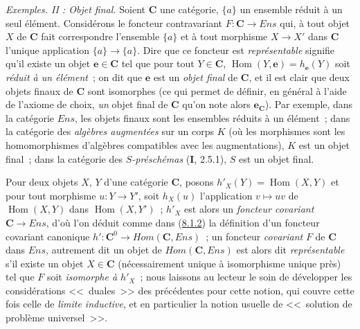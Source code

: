 \begin{env}[8.1.10]
\label{0.8.1.10-fr}
\textit{Exemples. II : Objet final.} Soient $\boldsymbol{C}$ une catégorie, $\{a\}$ un
ensemble réduit à un seul élément. Considérons le foncteur contravariant
$F:\boldsymbol{C}\to\boldsymbol{\mathit{Ens}}$ qui, à tout objet $X$ de $\boldsymbol{C}$ fait correspondre
l'ensemble $\{a\}$ et à tout morphisme $X\to X'$ dans $\boldsymbol{C}$ l'unique
application $\{a\}\to\{a\}$. Dire que ce foncteur est \emph{représentable}
signifie qu'il existe un objet $\boldsymbol{e}\in\boldsymbol{C}$ tel que pour tout $Y\in\boldsymbol{C}$,
$\operatorname{Hom}(Y,\boldsymbol{e})=h_{\mathbf{e}}(Y)$ soit \emph{réduit à un élément}~; on dit
que $\boldsymbol{e}$ est un \emph{objet final} de $\boldsymbol{C}$, et il est clair que deux objets
finaux de $\boldsymbol{C}$ sont isomorphes (ce qui permet de définir, en général à l'aide
de l'axiome de choix, \emph{un} objet final de $\boldsymbol{C}$ qu'on note alors $\boldsymbol{e}_{\mathbf{C}}$). Par
exemple, dans la catégorie $\boldsymbol{\mathit{Ens}}$, les objets finaux sont les
ensembles réduits à un élément~; dans la catégorie des \emph{algèbres
augmentées} sur un corps $K$ (où les morphismes sont les homomorphismes
d'algèbres compatibles avec les augmentations), $K$ est un objet final~;
dans la catégorie des \emph{$S$-préschémas} (\textbf{I}, 2.5.1), $S$ est un objet
final.
\end{env}

\begin{env}[8.1.11]
\label{0.8.1.11-fr}
Pour deux objets $X$, $Y$ d'une catégorie $\boldsymbol{C}$, posons
$h'_X(Y)=\operatorname{Hom}(X,Y)$ et pour tout morphisme $u:Y\to Y'$, soit
$h_X(u)$ l'application $v\mapsto uv$ de $\operatorname{Hom}(X,Y)$ dans
$\operatorname{Hom}(X,Y')$~; $h'_X$ est alors un \emph{foncteur covariant}
$\boldsymbol{C}\to\boldsymbol{\mathit{Ens}}$, d'où l'on déduit comme dans
(\hyperref[0.8.1.2-fr]{8.1.2}) la définition d'un foncteur covariant
canonique $h':\boldsymbol{C}^0\to\boldsymbol{\mathit{Hom}}(\boldsymbol{C},\boldsymbol{\mathit{Ens}})$~; un foncteur
\emph{covariant} $F$ de $\boldsymbol{C}$ dans $\boldsymbol{\mathit{Ens}}$, autrement dit un objet de
$\boldsymbol{\mathit{Hom}}(\boldsymbol{C},\boldsymbol{\mathit{Ens}})$ est alors dit \emph{représentable}
s'il existe un objet $X\in\boldsymbol{C}$ (nécessairement unique à isomorphisme unique
près) tel que $F$ soit \emph{isomorphe à $h'_X$}~; nous laissons au lecteur
le soin de développer les considérations <<~duales~>> des précédentes pour
cette notion, qui couvre cette fois celle de \emph{limite inductive}, et en
particulier la notion usuelle de <<~solution de problème universel~>>.
\end{env}

